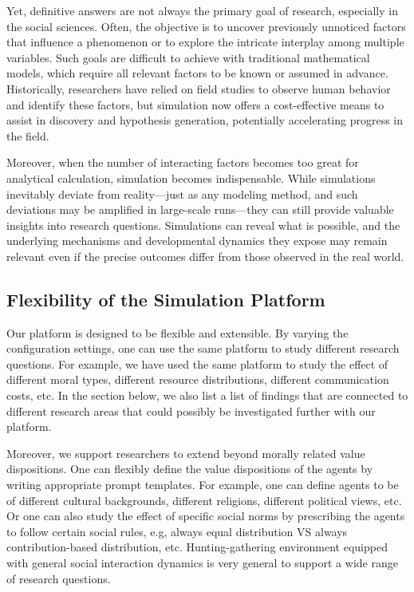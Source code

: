 Yet, definitive answers are not always the primary goal of research, especially in the social sciences. Often, the objective is to uncover previously unnoticed factors that influence a phenomenon or to explore the intricate interplay among multiple variables. Such goals are difficult to achieve with traditional mathematical models, which require all relevant factors to be known or assumed in advance. Historically, researchers have relied on field studies to observe human behavior and identify these factors, but simulation now offers a cost-effective means to assist in discovery and hypothesis generation, potentially accelerating progress in the field.

Moreover, when the number of interacting factors becomes too great for analytical calculation, simulation becomes indispensable. While simulations inevitably deviate from reality—just as any modeling method, and such deviations may be amplified in large-scale runs—they can still provide valuable insights into research questions. Simulations can reveal what is possible, and the underlying mechanisms and developmental dynamics they expose may remain relevant even if the precise outcomes differ from those observed in the real world.

\subsection{Flexibility of the Simulation Platform}
Our platform is designed to be flexible and extensible. By varying the configuration settings, one can use the same platform to study different research questions. For example, we have used the same platform to study the effect of different moral types, different resource distributions, different communication costs, etc. In the section below, we also list a list of findings that are connected to different research areas that could possibly be investigated further with our platform.

Moreover, we support researchers to extend beyond morally related value dispositions. One can flexibly define the value dispositions of the agents by writing appropriate prompt templates. For example, one can define agents to be of different cultural backgrounds, different religions, different political views, etc. Or one can also study the effect of specific social norms by prescribing the agents to follow certain social rules, e.g, always equal distribution VS always contribution-based distribution, etc. Hunting-gathering environment equipped with general social interaction dynamics is very general to support a wide range of research questions.

